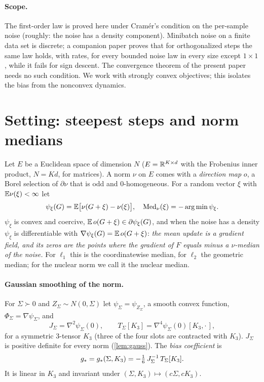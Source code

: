 \documentclass{article}
\theoremstyle{plain}
\theoremstyle{definition}
\theoremstyle{remark}
\begin{document}
\paragraph{Scope.} The first-order law is proved here under Cram\'er's condition on the per-sample noise (roughly:
the noise has a density component). Minibatch noise on a finite data set is discrete; a companion paper
\citep{companionII} proves that for orthogonalized steps the same law holds, with rates, for every bounded noise law in
every size except $1\times1$, while it fails for sign descent. The convergence theorem of the present paper needs no
such condition. We work with strongly convex objectives; this isolates the bias from the nonconvex dynamics.

\section{Setting: steepest steps and norm medians}\label{sec:setting}

Let $E$ be a Euclidean space of dimension $N$ ($E=\mathbb{R}^{K\times d}$ with the Frobenius inner product, $N=Kd$, for
matrices). A norm $\nu$ on $E$ comes with a \emph{direction map} $o$, a Borel selection of $\partial\nu$ that is odd and
$0$-homogeneous. For a random vector $\xi$ with $\mathbb{E}\nu(\xi)<\infty$ let
\[
\psi_\xi(G)=\mathbb{E}\big[\nu(G+\xi)-\nu(\xi)\big],\quad\operatorname{Med}_\nu(\xi)=-\arg\min\psi_\xi .
\]
$\psi_\xi$ is convex and coercive, $\mathbb{E}\,o(G+\xi)\in\partial\psi_\xi(G)$, and when the noise has a density $\psi_\xi$ is
differentiable with $\nabla\psi_\xi(G)=\mathbb{E}\,o(G+\xi)$: \emph{the mean update is a gradient field, and its zeros are the
points where the gradient of $F$ equals minus a $\nu$-median of the noise.} For $\ell_1$ this is the coordinatewise
median, for $\ell_2$ the geometric median; for the nuclear norm we call it the nuclear median.

\paragraph{Gaussian smoothing of the norm.} For $\Sigma\succ0$ and $Z_\Sigma\sim N(0,\Sigma)$ let
$\psi_\Sigma=\psi_{Z_\Sigma}$, a smooth convex function, $\Phi_\Sigma=\nabla\psi_\Sigma$, and
\begin{equation}\label{eq:JT}
J_\Sigma=\nabla^2\psi_\Sigma(0),\qquad T_\Sigma[K_3]=\nabla^4\psi_\Sigma(0)[K_3,\cdot\,],
\end{equation}
for a symmetric $3$-tensor $K_3$ (three of the four slots are contracted with $K_3$). $J_\Sigma$ is positive definite
for every norm (\cref{lem:gauss}). The \emph{bias coefficient} is
\begin{equation}\label{eq:gs}
g_\ast=g_\ast(\Sigma,K_3)=-\tfrac16\,J_\Sigma^{-1}\,T_\Sigma[K_3].
\end{equation}
It is linear in $K_3$ and invariant under $(\Sigma,K_3)\mapsto(c\Sigma,cK_3)$.
\end{document}
